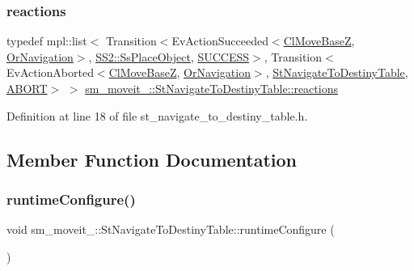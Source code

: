 \subsubsection{\texorpdfstring{reactions}{reactions}}
{\footnotesize\ttfamily typedef mpl\+::list$<$ Transition$<$Ev\+Action\+Succeeded$<$\hyperlink{classcl__move__base__z_1_1ClMoveBaseZ}{Cl\+Move\+BaseZ}, \hyperlink{classsm__moveit__4_1_1OrNavigation}{Or\+Navigation}$>$, \hyperlink{structsm__moveit__4_1_1SS2_1_1SsPlaceObject}{S\+S2\+::\+Ss\+Place\+Object}, \hyperlink{classSUCCESS}{S\+U\+C\+C\+E\+SS}$>$, Transition$<$Ev\+Action\+Aborted$<$\hyperlink{classcl__move__base__z_1_1ClMoveBaseZ}{Cl\+Move\+BaseZ}, \hyperlink{classsm__moveit__4_1_1OrNavigation}{Or\+Navigation}$>$, \hyperlink{structsm__moveit__4_1_1StNavigateToDestinyTable}{St\+Navigate\+To\+Destiny\+Table}, \hyperlink{classABORT}{A\+B\+O\+RT}$>$ $>$ \hyperlink{structsm__moveit__4_1_1StNavigateToDestinyTable_ae6317d7146c5e5611ad162f41e80c708}{sm\+\_\+moveit\+\_\+::\+St\+Navigate\+To\+Destiny\+Table\+::reactions}}



Definition at line 18 of file st\+\_\+navigate\+\_\+to\+\_\+destiny\+\_\+table.\+h.



\subsection{Member Function Documentation}
\mbox{\label{structsm__moveit__4_1_1StNavigateToDestinyTable_a0915874e66bb71287faacf856c0ceaed}} 
\subsubsection{\texorpdfstring{runtime\+Configure()}{runtimeConfigure()}}
{\footnotesize\ttfamily void sm\+\_\+moveit\+\_\+::\+St\+Navigate\+To\+Destiny\+Table\+::runtime\+Configure (\begin{DoxyParamCaption}{ }\end{DoxyParamCaption})\hspace{0.3cm}{\ttfamily [inline]}}



